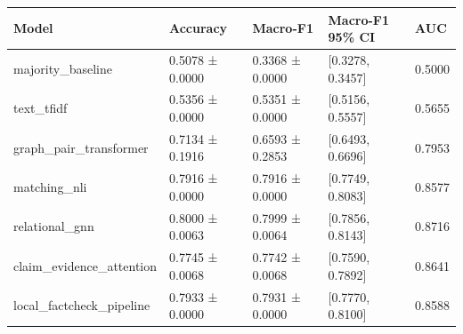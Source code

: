 \begin{tabular}{lllll}
\toprule
Model & Accuracy & Macro-F1 & Macro-F1 95\% CI & AUC \\
\midrule
majority\_baseline & 0.5078 ± 0.0000 & 0.3368 ± 0.0000 & [0.3278, 0.3457] & 0.5000 \\
text\_tfidf & 0.5356 ± 0.0000 & 0.5351 ± 0.0000 & [0.5156, 0.5557] & 0.5655 \\
graph\_pair\_transformer & 0.7134 ± 0.1916 & 0.6593 ± 0.2853 & [0.6493, 0.6696] & 0.7953 \\
matching\_nli & 0.7916 ± 0.0000 & 0.7916 ± 0.0000 & [0.7749, 0.8083] & 0.8577 \\
relational\_gnn & 0.8000 ± 0.0063 & 0.7999 ± 0.0064 & [0.7856, 0.8143] & 0.8716 \\
claim\_evidence\_attention & 0.7745 ± 0.0068 & 0.7742 ± 0.0068 & [0.7590, 0.7892] & 0.8641 \\
local\_factcheck\_pipeline & 0.7933 ± 0.0000 & 0.7931 ± 0.0000 & [0.7770, 0.8100] & 0.8588 \\
\bottomrule
\end{tabular}

